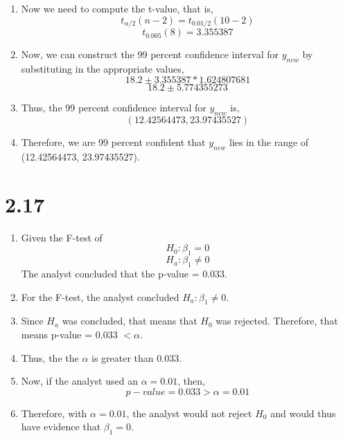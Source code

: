 \documentclass{article}
\begin{document}
\begin{enumerate}[label = \arabic*)]
		\item Now we need to compute the t-value, that is,
		\[t_{\alpha/2}(n-2) = t_{0.01/2}(10-2)\]
		\[t_{0.005}(8) = 3.355387\]
		\item Now, we can construct the 99 percent confidence interval for $y_{new}$ by substituting in the appropriate values,
		\[18.2 \pm 3.355387 * 1.624807681\]
		\[18.2 \pm  5.774355273\]
		\item Thus, the 99 percent confidence interval for $y_{new}$ is,
		\[(12.42564473, 23.97435527)\]
		\item Therefore, we are 99 percent confident that $y_{new}$ lies in the range of (12.42564473, 23.97435527).
	\end{enumerate}

\section*{2.17}
	\begin{enumerate}[label = \arabic*)]
		\item Given the F-test of
		\[H_0: \beta_1 = 0\]
		\[H_a: \beta_1 \neq 0\]
		The analyst concluded that the p-value = 0.033.
		\item For the F-test, the analyst concluded $H_a: \beta_1 \neq 0$.
		\item Since $H_a$ was concluded, that means that $H_0$ was rejected. Therefore, that means p-value = 0.033 $< \alpha$.
		\item Thus, the the $\alpha$ is greater than 0.033.
		\item Now, if the analyst used an $\alpha = 0.01$, then,
		\[p-value = 0.033 > \alpha = 0.01\]
		\item Therefore, with $\alpha = 0.01$, the analyst would not reject $H_0$ and would thus have evidence that $\beta_1 = 0$.
	\end{enumerate}
\end{document}
